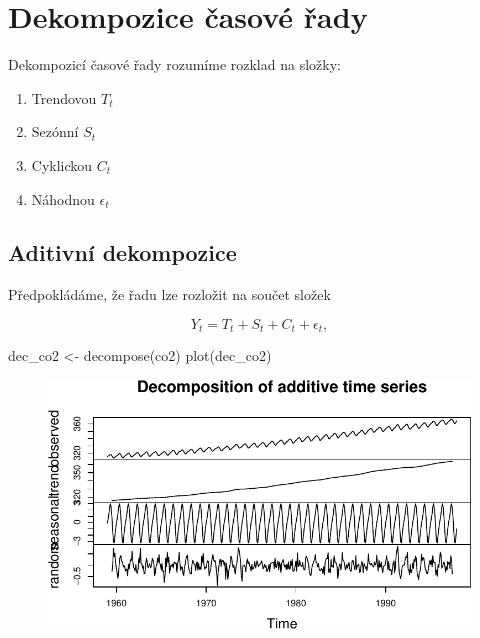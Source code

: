 \documentclass[
  letterpaper,
  DIV=11,
  numbers=noendperiod]{scrreprt}
\newenvironment{Shaded}{\begin{snugshade}}{\end{snugshade}}
\newcommand{\FunctionTok}[1]{\textcolor[rgb]{0.28,0.35,0.67}{#1}}
\newcommand{\NormalTok}[1]{\textcolor[rgb]{0.00,0.23,0.31}{#1}}
\newcommand{\OtherTok}[1]{\textcolor[rgb]{0.00,0.23,0.31}{#1}}
\providecommand{\tightlist}{%
  \setlength{\itemsep}{0pt}\setlength{\parskip}{0pt}}\usepackage{longtable,booktabs,array}
\begin{document}
\hypertarget{dekompozice-ux10dasovuxe9-ux159ady}{%
\section{Dekompozice časové
řady}\label{dekompozice-ux10dasovuxe9-ux159ady}}

Dekompozicí časové řady rozumíme rozklad na složky:

\begin{enumerate}
\def\labelenumi{\arabic{enumi}.}
\tightlist
\item
  Trendovou \(T_t\)
\item
  Sezónní \(S_t\)
\item
  Cyklickou \(C_t\)
\item
  Náhodnou \(\epsilon_t\)
\end{enumerate}

\hypertarget{aditivnuxed-dekompozice}{%
\subsection{Aditivní dekompozice}\label{aditivnuxed-dekompozice}}

Předpokládáme, že řadu lze rozložit na součet složek

\[
Y_t =T_t +S_t +C_t +\epsilon_t,
\]

\begin{Shaded}
\begin{Highlighting}[]
\NormalTok{dec\_co2 }\OtherTok{\textless{}{-}} \FunctionTok{decompose}\NormalTok{(co2)}
\FunctionTok{plot}\NormalTok{(dec\_co2)}
\end{Highlighting}
\end{Shaded}

\begin{figure}[H]

{\centering \includegraphics{09_casove_rady_files/figure-pdf/unnamed-chunk-3-1.pdf}

}

\end{figure}
\end{document}

